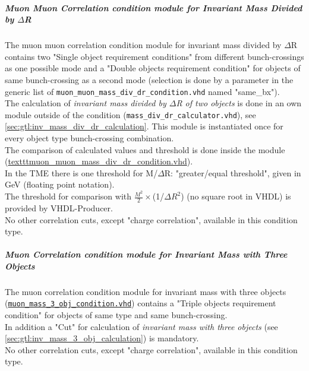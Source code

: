 
\subparagraph{Muon Muon Correlation condition module for Invariant Mass Divided by $\Delta$R}
\label{sec:gtl:muon_muon_correlation_condition_module_mass_div_dr}

The muon muon correlation condition module for invariant mass divided by $\Delta$R contains two "Single object requirement conditions" from different bunch-crossings as one possible mode and a "Double objects requirement condition" for objects of same bunch-crossing as a second mode (selection is done by a parameter in the generic list of \texttt{muon\_muon\_mass\_div\_dr\_condition.vhd} named "same\_bx").\\
The calculation of \textit{invariant mass divided by $\Delta$R of two objects} is done in an own module outside of the condition (\texttt{mass\_div\_dr\_calculator.vhd}), see \ref{sec:gtl:inv_mass_div_dr_calculation}. This module is instantiated once for every object type bunch-crossing combination.\\  
The comparison of calculated values and threshold is done inside the module (\href{https://github.com/cms-l1-globaltrigger/mp7_ugt_legacy/tree/master/firmware/hdl/gt_mp7_core/gtl_fdl_wrapper/gtl/muon_muon_mass_div_dr_condition.vhd}{texttt{muon\_muon\_mass\_div\_dr\_condition.vhd}}).\\
In the TME there is one threshold for M/$\Delta$R: "greater/equal threshold", given in GeV (floating point notation).\\
The threshold for comparison with $\frac{M^2}{2}\times$(1/$\Delta$$R^2$) (no square root in VHDL) is provided by VHDL-Producer.\\
No other correlation cuts, except "charge correlation", available in this condition type.

\subparagraph{Muon Correlation condition module for Invariant Mass with Three Objects}
\label{sec:gtl:muon_correlation_condition_module_mass_3_obj}

The muon correlation condition module for invariant mass with three objects (\href{https://github.com/cms-l1-globaltrigger/mp7_ugt_legacy/tree/master/firmware/hdl/gt_mp7_core/gtl_fdl_wrapper/gtl/muon_mass_3_obj_condition.vhd}{\texttt{muon\_mass\_3\_obj\_condition.vhd}}) contains a "Triple objects requirement condition" for objects of same type and same bunch-crossing.\\
In addition a "Cut" for calculation of \textit{invariant mass with three objects} (see \ref{sec:gtl:inv_mass_3_obj_calculation}) is mandatory.\\
No other correlation cuts, except "charge correlation", available in this condition type.

